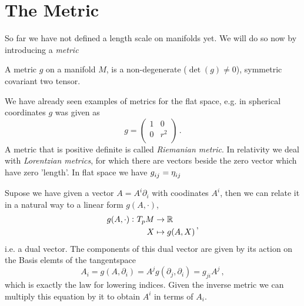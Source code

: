 \section{The Metric}
So far we have not defined a length scale on manifolds yet. We will do so now by
introducing a \emph{metric} 
\begin{definition}[Metric]
A metric $g$ on a manifold $M$, is a non-degenerate ($\det(g)\neq 0$), symmetric
covariant two tensor.
\end{definition}
We have already seen examples of metrics for the flat space, e.g. in spherical coordinates $g$ was given as
\begin{equation}
    g=
    \begin{pmatrix}
        1 & 0\\
        0 & r^2\\
    \end{pmatrix}\,.
\end{equation}
A metric that is positive definite is called \emph{Riemanian metric}. In
relativity we deal with \emph{Lorentzian metrics}, for which there are vectors
beside the zero vector which have zero 'length'. In flat space we have
$\tensor{g}{_i_j}=\tensor{\eta}{_i_j}$ \begin{remark} Supose we have given a vector $A=A^i\partial_i$
with coodinates $A^i$, then we can relate it 
in a natural way to a linear form $g(A,\cdot)$,
\begin{equation}
\begin{split}
 g(A,\cdot)\,\colon T_pM &\to \mathbb{R}\\
 X &\mapsto g(A,X)
\end{split}\, ,
\end{equation}
i.e. a dual vector. The components of this dual vector are given by its action
on the Basis elemts of the tangentspace
\begin{equation}
A_i=g(A,\partial_i)=A^jg(\partial_j,\partial_i)=g_{ji}A^j\,,
\end{equation}
which is exactly the law for lowering indices. Given the inverse metric we can
multiply this equation by it to obtain $A^i$ in terms of $A_i$.
\end{remark}
